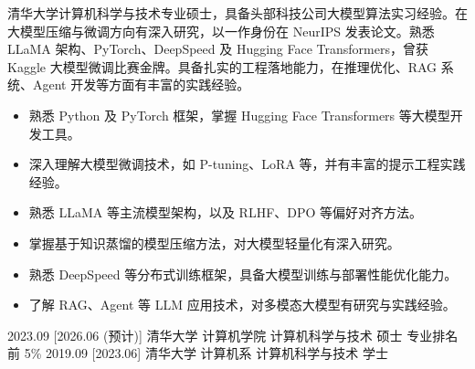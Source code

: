 \documentclass[zh]{resume}
\begin{document}
\makeheader

清华大学计算机科学与技术专业硕士，具备头部科技公司大模型算法实习经验。在大模型压缩与微调方向有深入研究，以一作身份在 NeurIPS 发表论文。熟悉 LLaMA 架构、PyTorch、DeepSpeed 及 Hugging Face Transformers，曾获 Kaggle 大模型微调比赛金牌。具备扎实的工程落地能力，在推理优化、RAG 系统、Agent 开发等方面有丰富的实践经验。

\begin{itemize}
    \item 熟悉 Python 及 PyTorch 框架，掌握 Hugging Face Transformers 等大模型开发工具。
    \item 深入理解大模型微调技术，如 P-tuning、LoRA 等，并有丰富的提示工程实践经验。
    \item 熟悉 LLaMA 等主流模型架构，以及 RLHF、DPO 等偏好对齐方法。
    \item 掌握基于知识蒸馏的模型压缩方法，对大模型轻量化有深入研究。
    \item 熟悉 DeepSpeed 等分布式训练框架，具备大模型训练与部署性能优化能力。
    \item 了解 RAG、Agent 等 LLM 应用技术，对多模态大模型有研究与实践经验。
\end{itemize}

\begin{educations}
  \education%
    {2023.09}%
    [2026.06 (预计)]%
    {清华大学}%
    {计算机学院}%
    {计算机科学与技术}%
    {硕士 \quad 专业排名前 5\%}
  \separator{0.5ex}
  \education%
    {2019.09}%
    [2023.06]%
    {清华大学}%
    {计算机系}%
    {计算机科学与技术}%
    {学士}
\end{educations}
\end{document}
